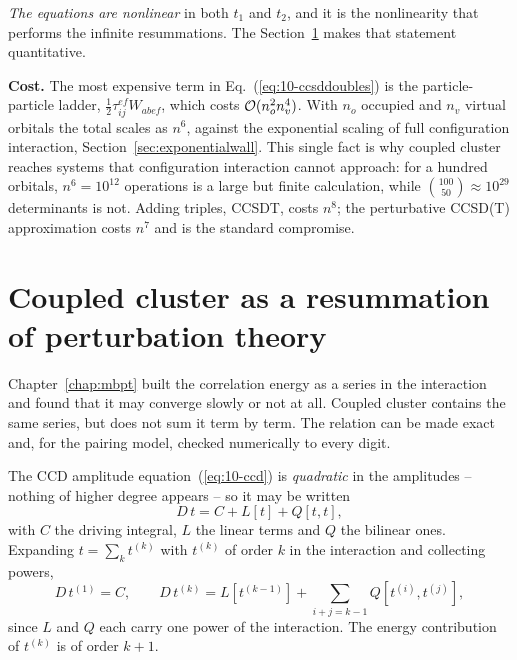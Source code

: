 \emph{The equations are nonlinear} in both $t_1$ and $t_2$, and it is the
nonlinearity that performs the infinite resummations.  The
Section~\ref{sec:ccdcontent} makes that statement quantitative.

\begin{notebox}
\textbf{Cost.}  The most expensive term in Eq.~(\ref{eq:10-ccsddoubles}) is
the particle-particle ladder, $\tfrac12\tau_{ij}^{ef}W_{abef}$, which costs
$\mathcal{O}(n_o^2n_v^4)$.  With $n_o$ occupied and $n_v$ virtual orbitals the
total scales as $n^6$, against the exponential scaling of full configuration
interaction, Section~\ref{sec:exponentialwall}.  This single fact is why
coupled cluster reaches systems that configuration interaction cannot
approach: for a hundred orbitals, $n^6=10^{12}$ operations is a large but
finite calculation, while $\binom{100}{50}\approx10^{29}$ determinants is not.
Adding triples, CCSDT, costs $n^8$; the perturbative CCSD(T) approximation
costs $n^7$ and is the standard compromise.
\end{notebox}

\section{Coupled cluster as a resummation of perturbation theory}
\label{sec:ccdcontent}

Chapter~\ref{chap:mbpt} built the correlation energy as a series in the
interaction and found that it may converge slowly or not at all.  Coupled
cluster contains the same series, but does not sum it term by term.  The
relation can be made exact and, for the pairing model, checked numerically to
every digit.

The CCD amplitude equation~(\ref{eq:10-ccd}) is \emph{quadratic} in the
amplitudes -- nothing of higher degree appears -- so it may be written
\begin{equation}
  D\,t = C + L[t] + Q[t,t],
  \label{eq:10-quadratic}
\end{equation}
with $C$ the driving integral, $L$ the linear terms and $Q$ the bilinear ones.
Expanding $t=\sum_k t^{(k)}$ with $t^{(k)}$ of order $k$ in the interaction and
collecting powers,
\begin{equation}
  D\,t^{(1)} = C,
  \qquad
  D\,t^{(k)} = L\!\left[t^{(k-1)}\right]
    + \sum_{i+j=k-1}Q\!\left[t^{(i)},t^{(j)}\right],
  \label{eq:10-orderbyorder}
\end{equation}
since $L$ and $Q$ each carry one power of the interaction.  The energy
contribution of $t^{(k)}$ is of order $k+1$.

